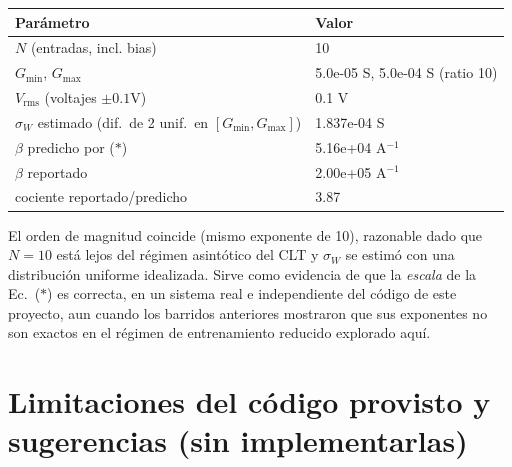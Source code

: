 \documentclass[11pt]{article}
\begin{document}
\begin{center}
\begin{tabular}{ll}
\toprule
Parámetro & Valor \\
\midrule
$N$ (entradas, incl. bias) & 10 \\
$G_{\min}$, $G_{\max}$ & 5.0e-05 S, 5.0e-04 S (ratio 10) \\
$V_{\text{rms}}$ (voltajes $\pm0.1$V) & 0.1 V \\
$\sigma_W$ estimado (dif.\ de 2 unif.\ en $[G_{\min},G_{\max}]$) & 1.837e-04 S \\
\midrule
$\beta$ predicho por ($\ast$) & 5.16e+04 A$^{-1}$ \\
$\beta$ reportado & 2.00e+05 A$^{-1}$ \\
cociente reportado/predicho & 3.87 \\
\bottomrule
\end{tabular}
\end{center}

El orden de magnitud coincide (mismo exponente de 10), razonable dado que $N=10$
está lejos del régimen asintótico del CLT y $\sigma_W$ se estimó con una
distribución uniforme idealizada. Sirve como evidencia de que la \emph{escala} de la
Ec.~($\ast$) es correcta, en un sistema real e independiente del código de este
proyecto, aun cuando los barridos anteriores mostraron que sus exponentes no son
exactos en el régimen de entrenamiento reducido explorado aquí.

\section{Limitaciones del código provisto y sugerencias (sin implementarlas)}
\label{sec:limitaciones}
\end{document}

